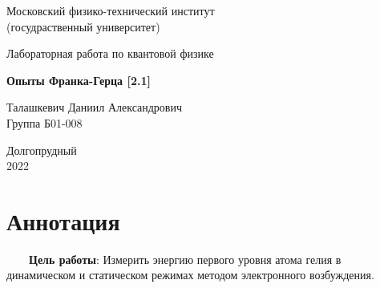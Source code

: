 \documentclass[a4paper, 12pt]{article}%
\begin{document}


\begin{titlepage}

	\newpage
	\begin{center}
		\normalsize Московский физико-технический институт \\(госудраственный 			университет)
	\end{center}

	\vspace{6em}

	\begin{center}
		\Large Лабораторная работа по квантовой физике\\
	\end{center}

	\vspace{1em}

	\begin{center}
		\large \textbf{Опыты Франка-Герца  [2.1]}
	\end{center}

	\vspace{2em}

	\begin{center}
		\large Талашкевич Даниил Александрович\\
		Группа Б01-008
	\end{center}

	\vspace{\fill}

	\begin{center}
	Долгопрудный \\2022
	\end{center}
	
\end{titlepage}



	\thispagestyle{empty}
	\newpage
	\tableofcontents
	\newpage
	\setcounter{page}{1}





\section{Аннотация}

\ \ \ \ \textbf{Цель работы}: Измерить энергию первого уровня атома гелия в динамическом и статическом режимах методом электронного возбуждения.
\end{document}
